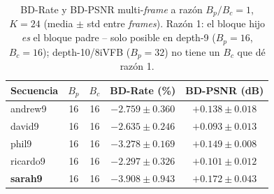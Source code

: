         \begin{table}[H]
            \centering
            \caption{BD-Rate y BD-PSNR multi-\textit{frame} a razón $B_p/B_c=1$, $K=24$ (media
            $\pm$ std entre \textit{frames}). Razón 1: el bloque hijo \emph{es} el bloque padre --
            solo posible en depth-9 ($B_p=16$, $B_c=16$); depth-10/8iVFB ($B_p=32$) no tiene un
            $B_c$ que dé razón 1.}
            \small
            \begin{tabular}{l|c|c|c|c}
                \hline
                \textbf{Secuencia} & $B_p$ & $B_c$ & \textbf{BD-Rate (\%)} & \textbf{BD-PSNR (dB)} \\
                \hline
                andrew9 & 16 & 16 & $-2.759 \pm 0.360$ & $+0.138 \pm 0.018$ \\
                david9 & 16 & 16 & $-2.635 \pm 0.246$ & $+0.093 \pm 0.013$ \\
                phil9 & 16 & 16 & $-3.278 \pm 0.169$ & $+0.149 \pm 0.008$ \\
                ricardo9 & 16 & 16 & $-2.297 \pm 0.326$ & $+0.101 \pm 0.012$ \\
                \textbf{sarah9} & 16 & 16 & $\mathbf{-3.908 \pm 0.943}$ & $\mathbf{+0.172 \pm 0.043}$ \\
                \hline
            \end{tabular}
            \label{tab:e10_bd_ratio1}
        \end{table}

